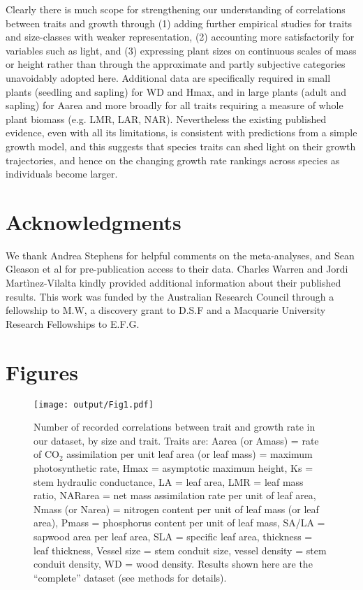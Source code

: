 \documentclass[a4paper,11pt]{article}
\begin{document}
Clearly there is much scope for strengthening our understanding of correlations between traits and growth through (1) adding further empirical studies for traits and size-classes with weaker representation, (2) accounting more satisfactorily for variables such as light, and (3) expressing plant sizes on continuous scales of mass or height rather than through the approximate and partly subjective categories unavoidably adopted here. Additional data are specifically required in small plants (seedling and sapling) for WD and Hmax, and in large plants (adult and sapling) for Aarea and more broadly for all traits requiring a measure of whole plant biomass (e.g. LMR, LAR, NAR). Nevertheless the existing published evidence, even with all its limitations, is consistent with predictions from a simple growth model, and this suggests that species traits can shed light on their growth trajectories, and hence on the changing growth rate rankings across species as individuals become larger.

\section*{Acknowledgments}\label{Acknowledgment}

We thank Andrea Stephens for helpful comments on the meta-analyses, and Sean Gleason et al for pre-publication access to their data. Charles Warren and Jordi Martìnez-Vilalta kindly provided additional information about their published results. This work was funded by the Australian Research Council through a fellowship to M.W, a discovery grant to D.S.F and a Macquarie University Research Fellowships to E.F.G.

\clearpage
\linespread{1}

\nocite{*}

\label{references}


\clearpage
\section*{Figures}

\begin{figure}[h!]
\centering
\texttt{[image: output/Fig1.pdf]}
\caption{Number of recorded correlations between trait and growth rate in our dataset, by size and trait. Traits are: Aarea (or Amass) = rate of CO$_{2}$ assimilation per unit leaf area (or leaf mass) = maximum photosynthetic rate, Hmax = asymptotic maximum height,  Ks = stem hydraulic conductance, LA = leaf area, LMR = leaf mass ratio, NARarea = net mass assimilation rate per unit of leaf area, Nmass (or Narea) = nitrogen content per unit of leaf mass (or leaf area), Pmass = phosphorus content per unit of leaf mass, SA/LA = sapwood area per leaf area, SLA = specific leaf area, thickness = leaf thickness, Vessel size = stem conduit size, vessel density = stem conduit density, WD = wood density. Results shown here are the ``complete'' dataset (see methods for details).}
\label{fig:fig1}
\end{figure}
\end{document}
